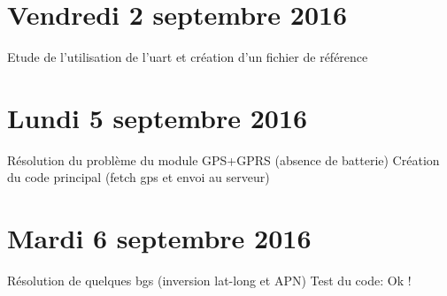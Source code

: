 \documentclass[a4paper,11pt]{article}
\begin{document}
\section{Vendredi 2 septembre 2016}
Etude de l'utilisation de l'uart et création d'un fichier de référence

\section{Lundi 5 septembre 2016}
Résolution du problème du module GPS+GPRS (absence de batterie) \newline
Création du code principal (fetch gps et envoi au serveur) \newline

\section{Mardi 6 septembre 2016}
Résolution de quelques bgs (inversion lat-long et APN) \newline
Test du code: Ok !
\end{document}
